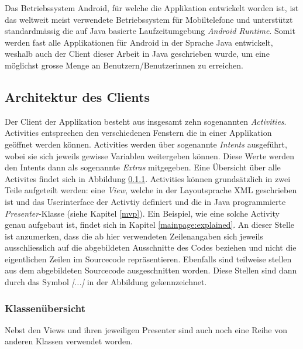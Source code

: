 \documentclass[a4paper,11pt]{report}
\begin{document}
			Das Betriebssystem Android, für welche die Applikation entwickelt worden ist, ist das weltweit meist verwendete Betriebssystem für Mobiltelefone und unterstützt standardmässig die auf Java basierte Laufzeitumgebung \emph{Android Runtime}. Somit werden fast alle Applikationen für Android in der Sprache Java entwickelt, weshalb auch der Client dieser Arbeit in Java geschrieben wurde, um eine möglichst grosse Menge an Benutzern/Benutzerinnen zu erreichen.\cite{android}
			
			\subsection{Architektur des Clients} %
			Der Client der Applikation besteht aus insgesamt zehn sogenannten \emph{Activities}. Activities entsprechen den verschiedenen Fenstern die in einer Applikation geöffnet werden können. Activities werden über sogenannte \emph{Intents} ausgeführt, wobei sie sich jeweils gewisse Variablen weitergeben können. Diese Werte werden den Intents dann als sogenannte \emph{Extras} mitgegeben. Eine Übersicht über alle Activites findet sich in Abbildung \ref{}. Activities können grundsätzlich in zwei Teile aufgeteilt werden: eine \emph{View}, welche in der Layoutsprache XML geschrieben ist und das Userinterface der Activtiy definiert und die in Java programmierte \emph{Presenter}-Klasse (siehe Kapitel \ref{mvp}). Ein Beispiel, wie eine solche Activity genau aufgebaut ist, findet sich in Kapitel \ref{mainpage:explained}. An dieser Stelle ist anzumerken, dass die ab hier verwendeten Zeilenangaben sich jeweils ausschliesslich auf die abgebildeten Ausschnitte des Codes beziehen und nicht die eigentlichen Zeilen im Sourcecode repräsentieren. Ebenfalls sind teilweise stellen aus dem abgebildeten Sourcecode ausgeschnitten worden. Diese Stellen sind dann durch das Symbol \emph{[...]} in der Abbildung gekennzeichnet.
				
				\subsubsection{Klassenübersicht} %
				Nebst den Views und ihren jeweiligen Presenter sind auch noch eine Reihe von anderen Klassen verwendet worden.
\end{document}
